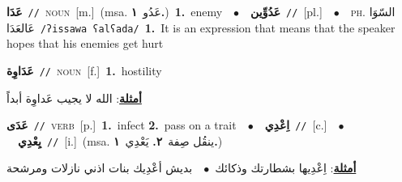 \documentclass[10pt,a4paper,twoside]{article} %
\begin{document}
\begin{multicols}{2}
{\setlength\topsep{0pt}\textbf{\foreignlanguage{arabic}{عَدَا}}\ {\color{gray}\texttt{//}\color{black}}\ \textsc{noun}\ [m.]\ \color{gray}(msa. \foreignlanguage{arabic}{عَدُو}~\foreignlanguage{arabic}{\textbf{١.}})\color{black}\ \textbf{1.}~enemy\ \ $\bullet$\ \ \setlength\topsep{0pt}\textbf{\foreignlanguage{arabic}{عَدُوِّين}}\ {\color{gray}\texttt{//}\color{black}}\ [pl.]\ \ $\bullet$\ \ \textsc{ph.} \color{gray} \foreignlanguage{arabic}{السّوَا عَالعَدَا}\color{black}\ {\color{gray}\texttt{/{\sffamily ʔissawa ʕalʕada}/}\color{black}}\ \textbf{1.}~It is an expression that means that the speaker hopes that his enemies get hurt\ } \vspace{2mm}

{\setlength\topsep{0pt}\textbf{\foreignlanguage{arabic}{عَدَاوِة}}\ {\color{gray}\texttt{//}\color{black}}\ \textsc{noun}\ [f.]\ \textbf{1.}~hostility\  \begin{flushright}\color{gray}\foreignlanguage{arabic}{\textbf{\underline{\foreignlanguage{arabic}{أمثلة}}}: الله لا يجيب عَداوِة أبداً}\end{flushright}\color{black}} \vspace{2mm}

{\setlength\topsep{0pt}\textbf{\foreignlanguage{arabic}{عَدَى}}\ {\color{gray}\texttt{//}\color{black}}\ \textsc{verb}\ [p.]\ \textbf{1.}~infect  \textbf{2.}~pass on a trait\ \ $\bullet$\ \ \setlength\topsep{0pt}\textbf{\foreignlanguage{arabic}{اِعْدِي}}\ {\color{gray}\texttt{//}\color{black}}\ [c.]\ \ $\bullet$\ \ \setlength\topsep{0pt}\textbf{\foreignlanguage{arabic}{يِعْدِي}}\ {\color{gray}\texttt{//}\color{black}}\ [i.]\ \color{gray}(msa. \foreignlanguage{arabic}{ينقُل صِفة}~\foreignlanguage{arabic}{\textbf{٢.}}  \foreignlanguage{arabic}{يَعْدِي}~\foreignlanguage{arabic}{\textbf{١.}})\color{black}\  \begin{flushright}\color{gray}\foreignlanguage{arabic}{\textbf{\underline{\foreignlanguage{arabic}{أمثلة}}}: اِعْدِيها بشطارتك وذكائك\ $\bullet$\ \  بديش أعْدِيك بنات اذني نازلات ومرشحة}\end{flushright}\color{black}} \vspace{2mm}


\end{multicols}
\end{document}
